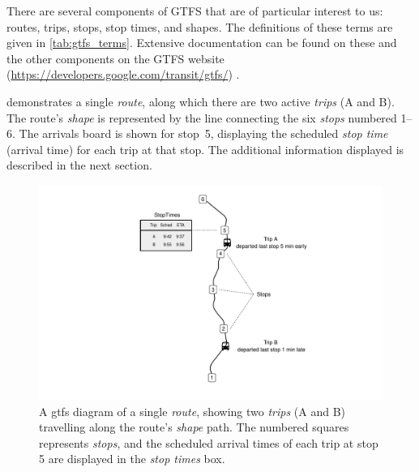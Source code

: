 There are several components of GTFS that are of particular interest to us: routes, trips, stops, stop times, and shapes. The definitions of these terms are given in \cref{tab:gtfs_terms}. Extensive documentation can be found on these and the other components on the GTFS website (\url{https://developers.google.com/transit/gtfs/}) \citep{GoogleDevelopers_2006}.


 demonstrates a single \emph{route}, along which there are two active \emph{trips} (A and B). The route's \emph{shape} is represented by the line connecting the six \emph{stops} numbered 1--6. The \rt{} arrivals board is shown for stop~5, displaying the scheduled \emph{stop time} (arrival time) for each trip at that stop. The additional information displayed is described in the next section.



\begin{knitrout}\small
{}\color{fgcolor}\begin{figure}

{\centering \includegraphics[width=\textwidth]{figure/gtfs_nw-1} 

}

\caption{A \gls{gtfs} diagram of a single \emph{route}, showing two \emph{trips} (A and B) travelling along the route's \emph{shape} path. The numbered squares represents \emph{stops}, and the scheduled arrival times of each trip at stop 5 are displayed in the \emph{stop times} box.}\label{fig:gtfs_nw}
\end{figure}


\end{knitrout}



